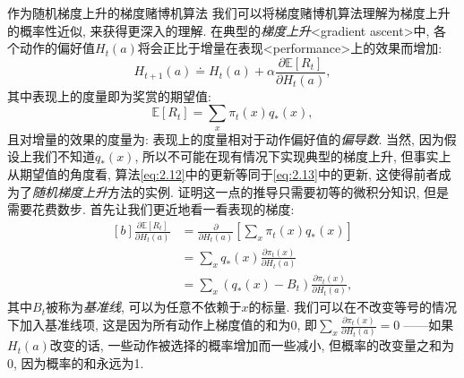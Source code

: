 \FloatBarrier
\begin{mathbox}{作为随机梯度上升的梯度赌博机算法}
我们可以将梯度赌博机算法理解为梯度上升的概率性近似, 来获得更深入的理解. 在典型的\emph{梯度上升}<gradient ascent>中, 各个动作的偏好值$H_t(a)$将会正比于增量在表现<performance>上的效果而增加:
\begin{equation}\label{eq:2.13}
H_{t + 1}(a) \doteq H_t(a) + \alpha \frac{\partial \mathbb{E}[R_t]}{\partial H_t(a)},
\end{equation}
其中表现上的度量即为奖赏的期望值:
\begin{equation*}
\mathbb{E}[R_t] = \sum_x \pi_t(x) q_*(x),
\end{equation*}
且对增量的效果的度量为: 表现上的度量相对于动作偏好值的\emph{偏导数}. 当然, 因为假设上我们不知道$q_*(x)$, 所以不可能在现有情况下实现典型的梯度上升, 但事实上从期望值的角度看, 算法\eqref{eq:2.12}中的更新等同于\eqref{eq:2.13}中的更新, 这使得前者成为了\emph{随机梯度上升}方法的实例. 证明这一点的推导只需要初等的微积分知识, 但是需要花费数步. 首先让我们更近地看一看表现的梯度:
\begin{equation*}
\begin{aligned}[b]
\frac{\partial \mathbb{E}[R_t]}{\partial H_t(a)} &= \frac{\partial}{\partial H_t(a)} \left[ \sum_x \pi_t(x) q_*(x) \right] \\
&= \sum_x q_*(x) \frac{\partial \pi_t(x)}{\partial H_t(a)} \\
&= \sum_x (q_*(x) - B_t) \frac{\partial \pi_t(x)}{\partial H_t(a)},
\end{aligned}
\end{equation*}
其中$B_t$被称为\emph{基准线}, 可以为任意不依赖于$x$的标量. 我们可以在不改变等号的情况下加入基准线项, 这是因为所有动作上梯度值的和为0, 即$\sum_x \frac{\partial \pi_t(x)}{\partial H_t(a)} = 0\;$——如果$H_t(a)$改变的话, 一些动作被选择的概率增加而一些减小, 但概率的改变量之和为0, 因为概率的和永远为1.


\end{mathbox}
